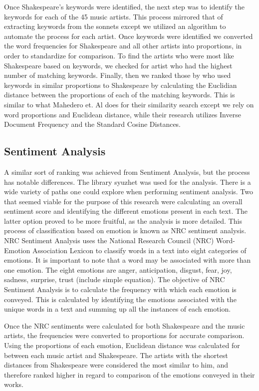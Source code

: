 \documentclass[10pt,a4paper]{article}
\begin{document}
\noindent Once Shakespeare’s keywords were identified, the next step was to identify the keywords for each of the 45 music artists. This process mirrored that of extracting keywords from the sonnets except we utilized an algorithm to automate the process for each artist. Once keywords were identified we converted the word frequencies for Shakespeare and all other artists into proportions, in order to standardize for comparison. To find the artists who were most like Shakespeare based on keywords, we checked for artist who had the highest number of matching keywords. Finally, then we ranked those by who used keywords in similar proportions to Shakespeare by calculating the Euclidian distance between the proportions of each of the matching keywords. This is similar to what Mahedero et. Al \cite{NLP-for-lyrics} does for their similarity search except we rely on word proportions and Euclidean distance, while their research utilizes Inverse Document Frequency and the Standard Cosine Distances. 

\subsection{Sentiment Analysis}
A similar sort of ranking was achieved from Sentiment Analysis, but the process has notable differences. The library syuzhet was used for the analysis. There is a wide variety of paths one could explore when performing sentiment analysis. Two that seemed viable for the purpose of this research were calculating an overall sentiment score and identifying the different emotions present in each text. \cite{syuzhet} The latter option proved to be more fruitful, as the analysis is more detailed. This process of classification based on emotion is known as NRC sentiment analysis. NRC Sentiment Analysis uses the National Research Council (NRC) Word-Emotion Association Lexicon to classify words in a text into eight categories of emotions. \cite{nrc-sentiment} It is important to note that a word may be associated with more than one emotion. The eight emotions are anger, anticipation, disgust, fear, joy, sadness, surprise, trust (include simple equation). \cite{nrc-sentiment} The objective of NRC Sentiment Analysis is to calculate the frequency with which each emotion is conveyed. This is calculated by identifying the emotions associated with the unique words in a text and summing up all the instances of each emotion\cite{syuzhet}. 

\noindent Once the NRC sentiments were calculated for both Shakespeare and the music artists, the frequencies were converted to proportions for accurate comparison. Using the proportions of each emotion, Euclidean distance was calculated for between each music artist and Shakespeare. The artists with the shortest distances from Shakespeare were considered the most similar to him, and therefore ranked higher in regard to comparison of the emotions conveyed in their works. 
\end{document}
